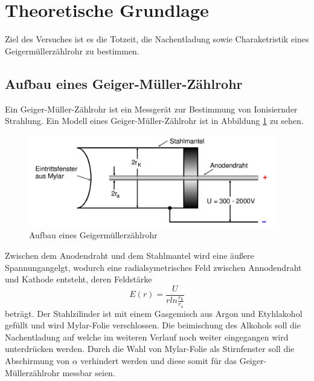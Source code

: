 \section{Theoretische Grundlage}
\label{sec:Theorie}
Ziel des Versuches ist es die Totzeit, die Nachentladung sowie Charaketristik eines Geigermüllerzählrohr zu bestimmen.

\subsection{Aufbau eines Geiger-Müller-Zählrohr}
Ein Geiger-Müller-Zählrohr ist ein Messgerät zur Bestimmung von Ionisiernder Strahlung. Ein Modell eines Geiger-Müller-Zählrohr ist in Abbildung \ref{fig:skizze} zu sehen. 
\begin{figure}
  \centering
  \includegraphics[height=4cm]{picture/Skizze.pdf}
  \caption{Aufbau eines Geigermüllerzählrohr \cite{sample}}
  \label{fig:skizze}
\end{figure}
Zwischen dem Anodendraht und dem Stahlmantel wird eine äußere Spannungangelgt, wodurch eine radialsymetrisches Feld zwischen Annodendraht und Kathode entsteht, deren Feldstärke 
\begin{equation}
  E(r) = \frac{U}{r ln \frac{r_\text{k}}{r_\text{a}}}
  \label{eqn:feld}
\end{equation}
beträgt. Der Stahlzilinder ist mit einem Gasgemisch aus Argon und Etyhlakohol gefüllt und wird Mylar-Folie verschlossen. Die beimischung des Alkohols soll die Nachentladung auf welche im weiteren Verlauf noch weiter eingegangen wird unterdrücken werden. Durch die Wahl von Mylar-Folie als Stirnfenster soll die Abschirmung von $\alpha$ verhindert werden und diese somit für das Geiger-Müllerzählrohr messbar seien.

